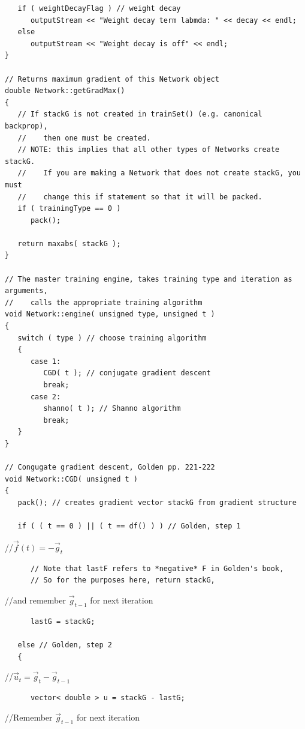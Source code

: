 \documentclass{report}[10pt]
\begin{document}
\begin{verbatim}
   if ( weightDecayFlag ) // weight decay
      outputStream << "Weight decay term labmda: " << decay << endl;
   else
      outputStream << "Weight decay is off" << endl;
}

// Returns maximum gradient of this Network object
double Network::getGradMax()
{
   // If stackG is not created in trainSet() (e.g. canonical backprop),
   //    then one must be created.
   // NOTE: this implies that all other types of Networks create stackG.
   //    If you are making a Network that does not create stackG, you must
   //    change this if statement so that it will be packed.
   if ( trainingType == 0 )
      pack();

   return maxabs( stackG );
}

// The master training engine, takes training type and iteration as arguments,
//    calls the appropriate training algorithm
void Network::engine( unsigned type, unsigned t )
{
   switch ( type ) // choose training algorithm
   {
      case 1:
         CGD( t ); // conjugate gradient descent
         break;
      case 2:
         shanno( t ); // Shanno algorithm
         break;
   }
}

// Congugate gradient descent, Golden pp. 221-222
void Network::CGD( unsigned t )
{
   pack(); // creates gradient vector stackG from gradient structure

   if ( ( t == 0 ) || ( t == df() ) ) // Golden, step 1
\end{verbatim}
\hspace{24 pt}//\hspace{4 pt}$\vec{f}(t)=-\vec{g}_t$
\begin{verbatim}
      // Note that lastF refers to *negative* F in Golden's book,
      // So for the purposes here, return stackG,
\end{verbatim}
\hspace{24 pt}//\hspace{4 pt}and remember $\vec{g}_{t-1}$ for next iteration
\begin{verbatim}
      lastG = stackG;

   else // Golden, step 2
   {
\end{verbatim}
\hspace{24 pt}//\hspace{4 pt}$\vec{u}_t=\vec{g}_t-\vec{g}_{t-1}$
\begin{verbatim}
      vector< double > u = stackG - lastG;
\end{verbatim}
\hspace{24 pt}//\hspace{4 pt}Remember $\vec{g}_{t-1}$ for next iteration
\end{document}
